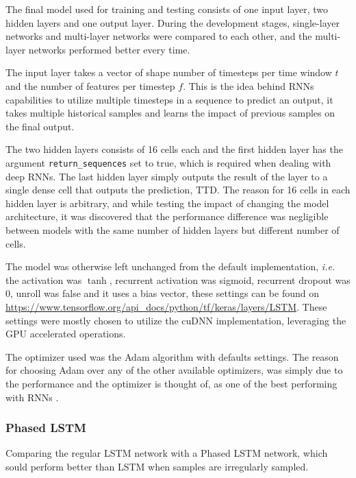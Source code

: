 \documentclass[../main.tex]{subfiles}
\begin{document}
The final model used for training and testing consists of one input layer, two hidden layers and one output layer. During the development stages, single-layer networks and multi-layer networks were compared to each other, and the multi-layer networks performed better every time. 

The input layer takes a vector of shape number of timesteps per time window $t$ and the number of features per timestep $f$. This is the idea behind RNNs capabilities to utilize multiple timesteps in a sequence to predict an output, it takes multiple historical samples and learns the impact of previous samples on the final output.

The two hidden layers consists of 16 cells each and the first hidden layer has the argument \texttt{return\_sequences} set to true, which is required when dealing with deep RNNs. The last hidden layer simply outputs the result of the layer to a single dense cell that outputs the prediction, TTD. The reason for 16 cells in each hidden layer is arbitrary, and while testing the impact of changing the model architecture, it was discovered that the performance difference was negligible between models with the same number of hidden layers but different number of cells.

The model was otherwise left unchanged from the default implementation, \textit{i.e.} the activation was $\tanh$, recurrent activation was sigmoid, recurrent dropout was 0, unroll was false and it uses a bias vector, these settings can be found on \url{https://www.tensorflow.org/api_docs/python/tf/keras/layers/LSTM}. These settings were mostly chosen to utilize the cuDNN implementation, leveraging the GPU accelerated operations.

The optimizer used was the Adam algorithm with defaults settings. The reason for choosing Adam over any of the other available optimizers, was simply due to the performance and the optimizer is thought of, as one of the best performing with RNNs \cite{El_2020, Choi_2019}.


\subsubsection{Phased LSTM}

Comparing the regular LSTM network with a Phased LSTM network, which sould perform better than LSTM when samples are irregularly sampled.
\end{document}
